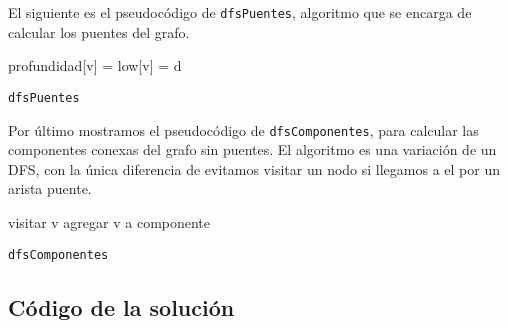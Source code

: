 El siguiente es el pseudocódigo de \texttt{dfsPuentes}, algoritmo que se encarga de calcular 
los puentes del grafo. 

\begin{algorithm}[H]
profundidad[v] = low[v] = d\;
\caption{\texttt{dfsPuentes}}
\end{algorithm}

Por último mostramos el pseudocódigo de \texttt{dfsComponentes}, para calcular 
las componentes conexas del grafo sin puentes. El algoritmo es una variación 
de un DFS, con la única diferencia de evitamos visitar un nodo si llegamos a el 
por un arista puente. 

\begin{algorithm}[H]
visitar v\;
agregar v a componente\;
\caption{\texttt{dfsComponentes}}
\end{algorithm}

\newpage
\subsection{Código de la solución}

